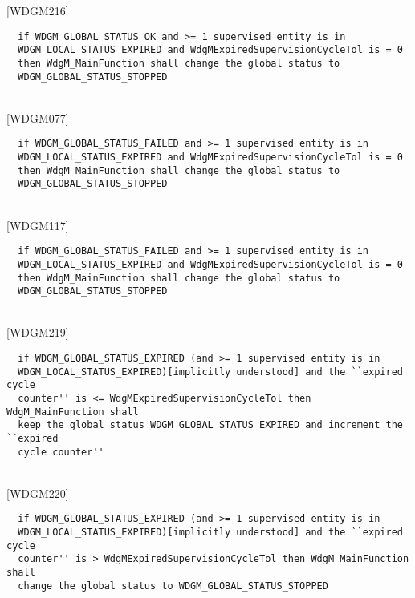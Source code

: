 \documentclass[11pt,a4paper]{article}
\begin{document}
[WDGM216]
\begin{lstlisting}
  if WDGM_GLOBAL_STATUS_OK and >= 1 supervised entity is in
  WDGM_LOCAL_STATUS_EXPIRED and WdgMExpiredSupervisionCycleTol is = 0
  then WdgM_MainFunction shall change the global status to
  WDGM_GLOBAL_STATUS_STOPPED
\end{lstlisting}~\\

[WDGM077]
\begin{lstlisting}
  if WDGM_GLOBAL_STATUS_FAILED and >= 1 supervised entity is in
  WDGM_LOCAL_STATUS_EXPIRED and WdgMExpiredSupervisionCycleTol is = 0
  then WdgM_MainFunction shall change the global status to
  WDGM_GLOBAL_STATUS_STOPPED
\end{lstlisting}~\\

[WDGM117]
\begin{lstlisting}
  if WDGM_GLOBAL_STATUS_FAILED and >= 1 supervised entity is in
  WDGM_LOCAL_STATUS_EXPIRED and WdgMExpiredSupervisionCycleTol is = 0
  then WdgM_MainFunction shall change the global status to
  WDGM_GLOBAL_STATUS_STOPPED
\end{lstlisting}~\\

[WDGM219]
\begin{lstlisting}
  if WDGM_GLOBAL_STATUS_EXPIRED (and >= 1 supervised entity is in
  WDGM_LOCAL_STATUS_EXPIRED)[implicitly understood] and the ``expired cycle
  counter'' is <= WdgMExpiredSupervisionCycleTol then WdgM_MainFunction shall
  keep the global status WDGM_GLOBAL_STATUS_EXPIRED and increment the ``expired
  cycle counter''
\end{lstlisting}~\\

[WDGM220]
\begin{lstlisting}
  if WDGM_GLOBAL_STATUS_EXPIRED (and >= 1 supervised entity is in
  WDGM_LOCAL_STATUS_EXPIRED)[implicitly understood] and the ``expired cycle
  counter'' is > WdgMExpiredSupervisionCycleTol then WdgM_MainFunction shall
  change the global status to WDGM_GLOBAL_STATUS_STOPPED
\end{lstlisting}~\\

\lstset{language=c}
\end{document}
